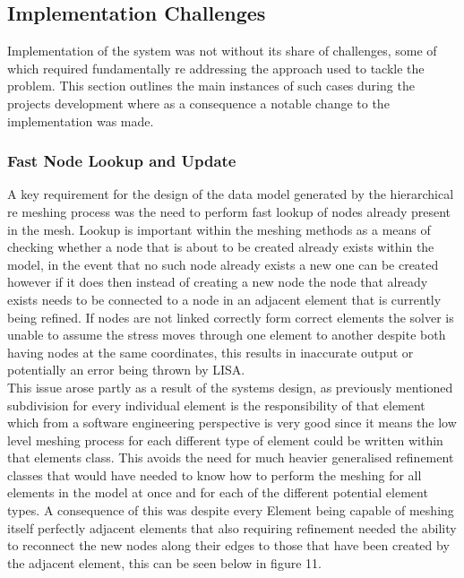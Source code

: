\subsection{Implementation Challenges}
Implementation of the system was not without its share of challenges, some of which required fundamentally re addressing the approach used to tackle the problem. This section outlines the main instances of such cases during the projects development where as a consequence a notable change to the implementation was made.

\subsubsection{Fast Node Lookup and Update}
A key requirement for the design of the data model generated by the hierarchical re meshing process was the need to perform fast lookup of nodes already present in the mesh. Lookup is important within the meshing methods as a means of checking whether a node that is about to be created already exists within the model, in the event that no such node already exists a new one can be created however if it does then instead of creating a new node the node that already exists needs to be connected to a node in an adjacent element that is currently being refined. If nodes are not linked correctly form correct elements the solver is unable to assume the stress moves through one element to another despite both having nodes at the same coordinates, this results in inaccurate output or potentially an error being thrown by LISA. \\ 

\noindent
This issue arose partly as a result of the systems design, as previously mentioned subdivision for every individual element is the responsibility of that element which from a software engineering perspective is very good since it means the low level meshing process for each different type of element could be written within that elements class. This avoids the need for much heavier generalised refinement classes that would have needed to know how to perform the meshing for all elements in the model at once and for each of the different potential element types. A consequence of this was despite every Element being capable of meshing itself perfectly adjacent elements that also requiring refinement needed the ability to reconnect the new nodes along their edges to those that have been created by the adjacent element, this can be seen below in figure 11. \\ 


